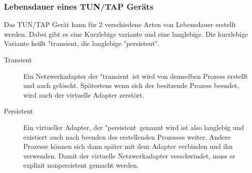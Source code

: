 \subsubsection{Lebensdauer eines TUN/TAP Geräts}
Das TUN/TAP Gerät kann für 2 verschiedene Arten von Lebensdauer erstellt werden. Dabei gibt es eine Kurzlebige variante und eine langlebige. Die kurzlebige Variante heißt "transient\dq , die langlebige "persistent".
\\
\begin{description}
    \item[Transient] Ein Netzwerkadapter der "transient\dq \ ist wird von demselben Prozess erstellt und auch gelöscht. Spätestens wenn sich der besitzende Prozess beendet, wird auch der virtuelle Adapter zerstört.
    \item[Persistent] Ein virtueller Adapter, der "persistent\dq \ genannt wird ist also langlebig und existiert auch nach beenden des erstellenden Prozesses weiter. Andere Prozesse können sich dann später mit dem Adapter verbinden und ihn verwenden. Damit der virtuelle Netzwerkadapter verschwindet, muss er explizit nonpersistent gemacht werden.
\end{description}

